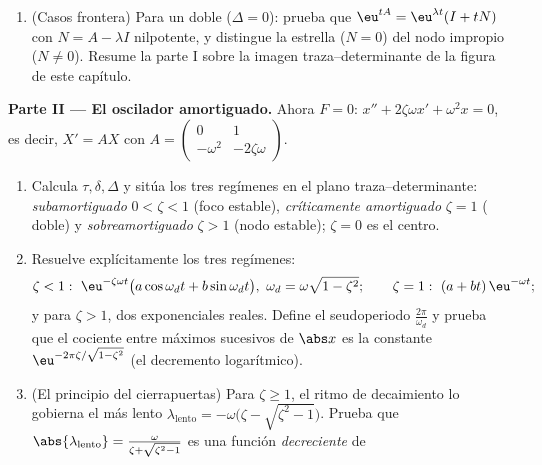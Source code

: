 \begin{problem}
\begin{enumerate}
        admitido en esa generalidad o demostrado para los sistemas
        de la parte II, que son los que se usan más abajo) para
        describir las órbitas: espirales convergentes para $\alpha
        = \frac\tau2 < 0$, divergentes para $\tau > 0$, y curvas
        cerradas (centro) para $\tau = 0$.
  \item (Casos frontera) Para un  doble ($\Delta =
        0$): prueba que $\eu^{tA} = \eu^{\lambda t}(I + tN)$ con $N
        = A - \lambda I$ nilpotente, y distingue la estrella ($N =
        0$) del nodo impropio ($N \neq 0$). Resume la parte I sobre
        la imagen traza--determinante de la figura de este
        capítulo.
\end{enumerate}

\medskip
\noindent\textbf{Parte II --- El oscilador amortiguado.} Ahora $F =
0$: $x'' + 2\zeta\omega x' + \omega^2x = 0$, es decir, $X' = AX$ con
$A = \begin{pmatrix} 0 & 1\\ -\omega^2 &
-2\zeta\omega\end{pmatrix}$.
\begin{enumerate}[resume]
  \item Calcula $\tau, \delta, \Delta$ y sitúa los tres regímenes en
        el plano traza--determinante: \emph{subamortiguado} $0 <
        \zeta < 1$ (foco estable), \emph{críticamente amortiguado}
        $\zeta = 1$ ( doble) y \emph{sobreamortiguado}
        $\zeta > 1$ (nodo estable); $\zeta = 0$ es el centro.
  \item Resuelve explícitamente los tres regímenes:
        \[
        \zeta < 1:\ \eu^{-\zeta\omega t}\bigl(a\cos\omega_d t
        + b\sin\omega_dt\bigr),\ \omega_d =
        \omega\sqrt{1-\zeta^2};
        \qquad
        \zeta = 1:\ (a + bt)\,\eu^{-\omega t};
        \]
        y para $\zeta > 1$, dos exponenciales reales. Define el
        seudoperiodo $\frac{2\pi}{\omega_d}$ y prueba que el
        cociente entre máximos sucesivos de $\abs x$ es la constante
        $\eu^{-2\pi\zeta/\sqrt{1-\zeta^2}}$ (el decremento
        logarítmico).
  \item (El principio del cierrapuertas) Para $\zeta \geq 1$, el
        ritmo de decaimiento lo gobierna el  más lento
        $\lambda_{\mathrm{lento}} = -\omega\bigl(\zeta -
        \sqrt{\zeta^2-1}\bigr)$. Prueba que
        $\abs{\lambda_{\mathrm{lento}}} = \frac{\omega}{\zeta +
        \sqrt{\zeta^2 - 1}}$ es una función \emph{decreciente} de

\end{enumerate}
\end{problem}
